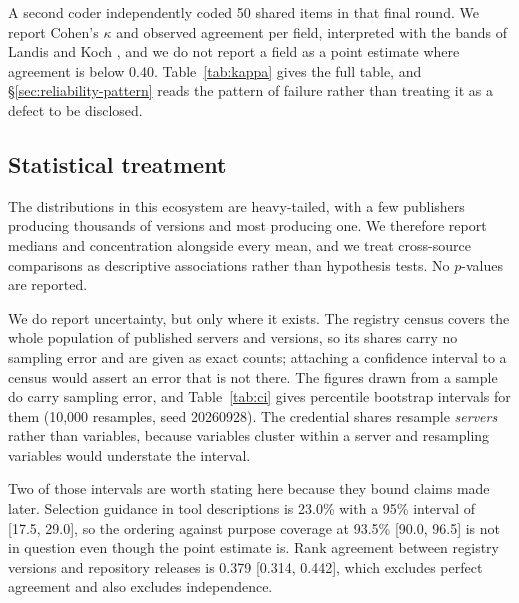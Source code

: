 \documentclass[a4paper,fleqn]{cas-dc}
\begin{document}
A second coder independently coded 50 shared items in that final round. We
report Cohen's $\kappa$ \citep{cohen1960} and observed agreement per field,
interpreted with the bands of Landis and Koch \citep{landis1977}, and we do not
report a field as a point estimate where agreement is below 0.40.
Table~\ref{tab:kappa} gives the full table, and \S\ref{sec:reliability-pattern}
reads the pattern of failure rather than treating it as a defect to be
disclosed.

\subsection{Statistical treatment}

The distributions in this ecosystem are heavy-tailed, with a few publishers
producing thousands of versions and most producing one. We therefore report
medians and concentration alongside every mean, and we treat cross-source
comparisons as descriptive associations rather than hypothesis tests. No
$p$-values are reported.

We do report uncertainty, but only where it exists. The registry census covers
the whole population of published servers and versions, so its shares carry no
sampling error and are given as exact counts; attaching a confidence interval
to a census would assert an error that is not there. The figures drawn from a
sample do carry sampling error, and Table~\ref{tab:ci} gives percentile
bootstrap intervals for them (10,000 resamples, seed 20260928). The credential
shares resample \emph{servers} rather than variables, because variables cluster
within a server and resampling variables would understate the interval.

Two of those intervals are worth stating here because they bound claims made
later. Selection guidance in tool descriptions is 23.0\% with a 95\% interval
of [17.5, 29.0], so the ordering against purpose coverage at 93.5\%
[90.0, 96.5] is not in question even though the point estimate is. Rank
agreement between registry versions and repository releases is 0.379
[0.314, 0.442], which excludes perfect agreement and also excludes independence.
\end{document}
